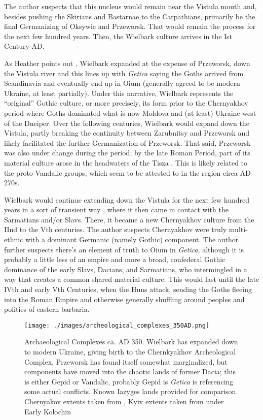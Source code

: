 \documentclass{article}
\begin{document}
	The author suspects that this nucleus would remain near the Vistula mouth and, besides pushing the Skirians and Bastarnae to the Carpathians, primarily be the final Germanizing of Oksywie and Przeworsk.
	That would remain the process for the next few hundred years.
	Then, the Wielbark culture arrives in the Ist Century AD.
	
	As Heather points out \cite{HeatherEmpiresAndBarbarians}, Wielbark expanded at the expense of Przeworsk, down the Vistula river and this lines up with \textit{Getica} saying the Goths arrived from Scandinavia and eventually end up in Oium (generally agreed to be modern Ukraine, at least partially).
	Under this narrative, Wielbark represents the “original” Gothic culture, or more precisely, its form prior to the Chernyakhov period where Goths dominated what is now Moldova and (at least) Ukraine west of the Dneiper.
	Over the following centuries, Wielbark would expand down the Vistula, partly breaking the continuity between Zarubnitsy and Przeworsk and likely facilitated the further Germanization of Przeworsk. 
	That said, Przeworsk was also under change during the period; by the late Roman Period, part of its material culture arose in the headwaters of the Tisza \cite{PrzeworskHistory}. This is likely related to the proto-Vandalic groups, which seem to be attested to in the region circa AD 270s.
	
	Wielbark would continue extending down the Vistula for the next few hundred years in a sort of transient way \cite{HeatherEmpiresAndBarbarians}, where it then came in contact with the Sarmatians and/or Slavs.
	There, it became a new Chernyakhov culture from the IInd to the Vth centuries.
	The author suspects Chernyakhov were truly multi-ethnic with a dominant Germanic (namely Gothic) component.
	The author further suspects there’s an element of truth to Oium in \textit{Getica}, although it is probably a little less of an empire and more a broad, confederal Gothic dominance of the early Slavs, Dacians, and Sarmatians, who intermingled in a way that creates a common shared material culture.
	This would last until the late IVth and early Vth Centuries, when the Huns attack, sending the Goths fleeing into the Roman Empire and otherwise generally shuffling around peoples and polities of eastern barbaria. 
	
	\begin{figure}[h!]
		\centering
		\texttt{[image: ./images/archeological\_complexes\_350AD.png]}
		\caption{Archaeological Complexes ca. AD 350.
			\newline\tiny Wielbark has expanded down to modern Ukraine, giving birth to the Chernkyakhov Archeological Complex.
			Przeworsk has found itself somewhat marginalized, but components have moved into the chaotic lands of former Dacia; this is either Gepid or Vandalic, probably Gepid is \textit{Getica} is referencing some actual conflicts. Known Iazyges lands provided for comparison. Chernyakov extents taken from \cite{HeatherEmpiresAndBarbarians,IndoEuroEncyclopedia}, Kyiv extents taken from \cite{IndoEuroEncyclopedia} under Early Kolochin}
	\end{figure}
	
\end{document}
